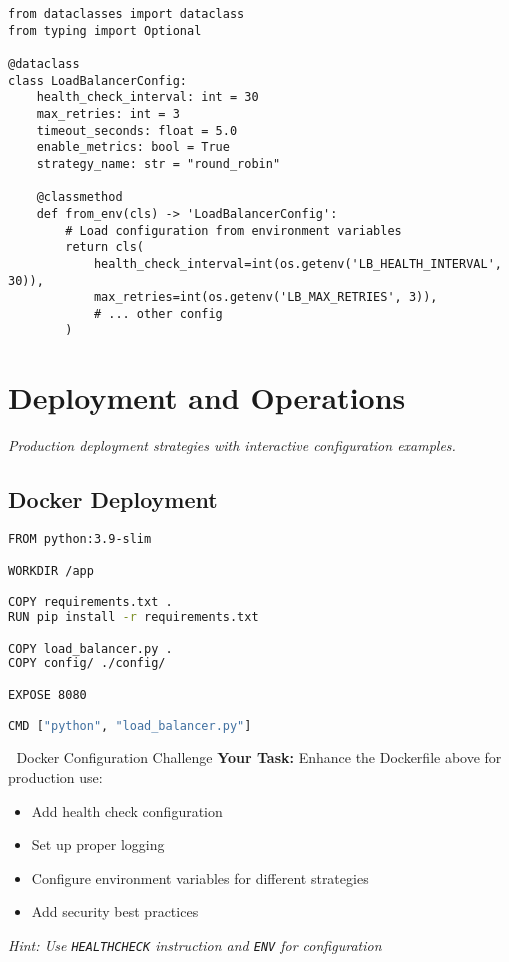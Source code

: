 \documentclass[12pt,a4paper]{article}
\begin{document}
\begin{lstlisting}[caption=Configuration Class]
from dataclasses import dataclass
from typing import Optional

@dataclass
class LoadBalancerConfig:
    health_check_interval: int = 30
    max_retries: int = 3
    timeout_seconds: float = 5.0
    enable_metrics: bool = True
    strategy_name: str = "round_robin"
    
    @classmethod
    def from_env(cls) -> 'LoadBalancerConfig':
        # Load configuration from environment variables
        return cls(
            health_check_interval=int(os.getenv('LB_HEALTH_INTERVAL', 30)),
            max_retries=int(os.getenv('LB_MAX_RETRIES', 3)),
            # ... other config
        )
\end{lstlisting}

\section{Deployment and Operations}
\label{sec:deployment}

\textit{Production deployment strategies with interactive configuration examples.}

\subsection{Docker Deployment}
\label{subsec:docker}

\begin{lstlisting}[language=bash, caption=Dockerfile Example,label=lst:dockerfile]
FROM python:3.9-slim

WORKDIR /app

COPY requirements.txt .
RUN pip install -r requirements.txt

COPY load_balancer.py .
COPY config/ ./config/

EXPOSE 8080

CMD ["python", "load_balancer.py"]
\end{lstlisting}

\begin{exercisebox}{🐳 Docker Configuration Challenge}
\textbf{Your Task:} Enhance the Dockerfile above for production use:
\begin{itemize}
    \item Add health check configuration
    \item Set up proper logging
    \item Configure environment variables for different strategies
    \item Add security best practices
\end{itemize}
\textit{Hint: Use \texttt{HEALTHCHECK} instruction and \texttt{ENV} for configuration}
\end{exercisebox}
\end{document}
